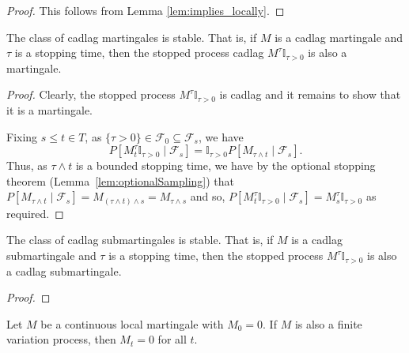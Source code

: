 \begin{proof}\leanok
This follows from Lemma \ref{lem:implies_locally}.
\end{proof}


\begin{lemma}\label{lem:stable_IsMartingale}
  \leanok
The class of cadlag martingales is stable. That is, if $M$ is a cadlag martingale and $\tau$ is a stopping time, then the stopped process cadlag $M^{\tau}\mathbb{I}_{\tau > 0}$ is also a martingale.
\end{lemma}

\begin{proof}
  \leanok
  Clearly, the stopped process $M^{\tau}\mathbb{I}_{\tau > 0}$ is cadlag and it remains to show that it is a martingale.

  Fixing $s \le t \in T$, as $\{\tau > 0\} \in \mathcal{F}_0 \subseteq \mathcal{F}_s$, we have
  $$P[M^{\tau}_t \mathbb{I}_{\tau > 0} \mid \mathcal{F}_s] = \mathbb{I}_{\tau > 0}P[M_{\tau \wedge t} \mid \mathcal{F}_{s}].$$
  Thus, as $\tau \wedge t$ is a bounded stopping time, we have by the optional stopping theorem
  (Lemma~\ref{lem:optionalSampling}) that $P[M_{\tau \wedge t} \mid \mathcal{F}_{s}] = M_{(\tau \wedge t) \wedge s} = M_{\tau \wedge s}$
  and so, $P[M^{\tau}_t \mathbb{I}_{\tau > 0} \mid \mathcal{F}_s] = M^{\tau}_s \mathbb{I}_{\tau > 0}$ as required.
\end{proof}


\begin{lemma}\label{lem:stable_IsSubmartingale}
  \leanok
The class of cadlag submartingales is stable. That is, if $M$ is a cadlag submartingale and $\tau$ is a stopping time, then the stopped process $M^{\tau}\mathbb{I}_{\tau > 0}$ is also a cadlag submartingale.
\end{lemma}

\begin{proof}

\end{proof}


\begin{theorem}\label{thm:IsLocalMartingale.eq_zero_of_finiteVariation}
Let $M$ be a continuous local martingale with $M_0 = 0$. If $M$ is also a finite variation process, then $M_t = 0$ for all $t$.
\end{theorem}

